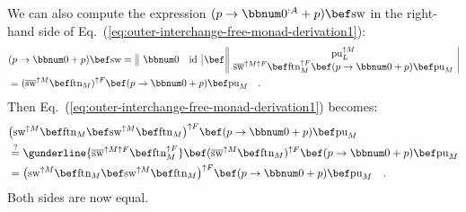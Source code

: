 We can also compute the expression $(p\rightarrow\bbnum 0^{:A}+p)\bef\text{sw}$
in the right-hand side of Eq.~(\ref{eq:outer-interchange-free-monad-derivation1}):
\begin{align*}
 & (p\rightarrow\bbnum 0+p)\bef\text{sw}=\,\begin{array}{||cc|}
\bbnum 0 & \text{id}\end{array}\,\bef\,\begin{array}{||c|}
\text{pu}_{L}^{\uparrow M}\\
\overline{\text{sw}}^{\uparrow M\uparrow F}\bef\text{ftn}_{M}^{\uparrow F}\bef(p\rightarrow\bbnum 0+p)\bef\text{pu}_{M}
\end{array}\\
 & =(\overline{\text{sw}}^{\uparrow M}\bef\text{ftn}_{M})^{\uparrow F}\bef(p\rightarrow\bbnum 0+p)\bef\text{pu}_{M}\quad.
\end{align*}
Then Eq.~(\ref{eq:outer-interchange-free-monad-derivation1}) becomes:
\begin{align*}
 & \big(\text{sw}^{\uparrow M}\bef\text{ftn}_{M}\bef\text{sw}^{\uparrow M}\bef\text{ftn}_{M}\big)^{\uparrow F}\bef(p\rightarrow\bbnum 0+p)\bef\text{pu}_{M}\\
 & \overset{?}{=}\gunderline{\overline{\text{sw}}^{\uparrow M\uparrow F}\bef\text{ftn}_{M}^{\uparrow F}}\bef(\overline{\text{sw}}^{\uparrow M}\bef\text{ftn}_{M})^{\uparrow F}\bef(p\rightarrow\bbnum 0+p)\bef\text{pu}_{M}\\
 & =\big(\text{sw}^{\uparrow M}\bef\text{ftn}_{M}\bef\text{sw}^{\uparrow M}\bef\text{ftn}_{M}\big)^{\uparrow F}\bef(p\rightarrow\bbnum 0+p)\bef\text{pu}_{M}\quad.
\end{align*}
Both sides are now equal.

